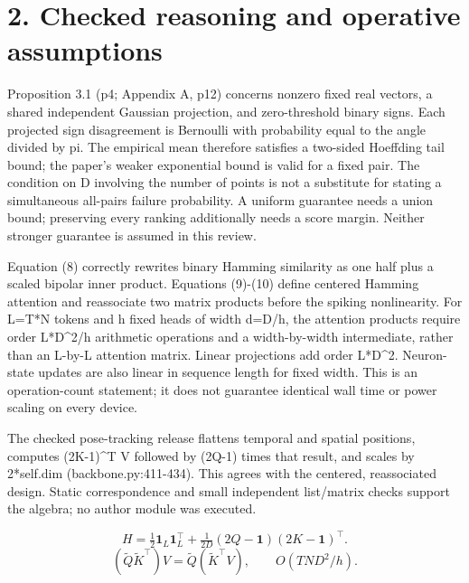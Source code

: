 \documentclass[10pt]{article}
\begin{document}
\section*{2. Checked reasoning and operative assumptions}
Proposition 3.1 (p4; Appendix A, p12) concerns nonzero fixed real vectors, a shared independent Gaussian projection, and zero-threshold binary signs. Each projected sign disagreement is Bernoulli with probability equal to the angle divided by pi. The empirical mean therefore satisfies a two-sided Hoeffding tail bound; the paper’s weaker exponential bound is valid for a fixed pair. The condition on D involving the number of points is not a substitute for stating a simultaneous all-pairs failure probability. A uniform guarantee needs a union bound; preserving every ranking additionally needs a score margin. Neither stronger guarantee is assumed in this review.\par
Equation (8) correctly rewrites binary Hamming similarity as one half plus a scaled bipolar inner product. Equations (9)-(10) define centered Hamming attention and reassociate two matrix products before the spiking nonlinearity. For L=T*N tokens and h fixed heads of width d=D/h, the attention products require order L*D\textasciicircum{}2/h arithmetic operations and a width-by-width intermediate, rather than an L-by-L attention matrix. Linear projections add order L*D\textasciicircum{}2. Neuron-state updates are also linear in sequence length for fixed width. This is an operation-count statement; it does not guarantee identical wall time or power scaling on every device.\par
The checked pose-tracking release flattens temporal and spatial positions, computes (2K-1)\textasciicircum{}T V followed by (2Q-1) times that result, and scales by 2*self.dim (backbone.py:411-434). This agrees with the centered, reassociated design. Static correspondence and small independent list/matrix checks support the algebra; no author module was executed.\par
\[H=\tfrac12\mathbf1_L\mathbf1_L^\top+\tfrac{1}{2D}(2Q-\mathbf1)(2K-\mathbf1)^\top.\] \[(\widetilde Q\widetilde K^\top)V=\widetilde Q(\widetilde K^\top V),\qquad O(TND^2/h).\]\par
\end{document}
